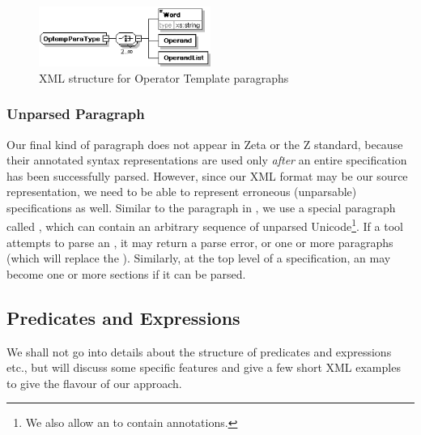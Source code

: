 \documentclass{llncs}  %
\newcommand{\Zeta}{Zeta}
\begin{document}
\begin{figure}[htbp]
  \centering
  \includegraphics[width=0.5\textwidth]{optempparatype.eps}
  \caption{XML structure for Operator Template paragraphs}
  \label{fig:optemppara}
\end{figure}


\subsubsection{Unparsed Paragraph}

Our final kind of paragraph does not appear in {\Zeta}
or the Z standard, because their annotated syntax representations
are used only \emph{after} an entire specification has been successfully
parsed.  However, since our XML format may be our source representation,
we need to be able to represent erroneous (unparsable) specifications as
well.  Similar to the  paragraph in \CADiZ, we use a
special paragraph called , which can contain an
arbitrary sequence of unparsed Unicode\footnote{We also allow an
   to contain annotations.}.  If a tool attempts to parse
an , it may return a parse error, or one or more
paragraphs (which will replace the ).  Similarly,
at the top level of a specification, an  may become
one or more sections if it can be parsed.



\subsection{Predicates and Expressions} \label{sec:expr}

We shall not go into details about the structure of predicates and
expressions etc., but will discuss some specific features and give
a few short XML examples to give the flavour of our approach.
\end{document}
